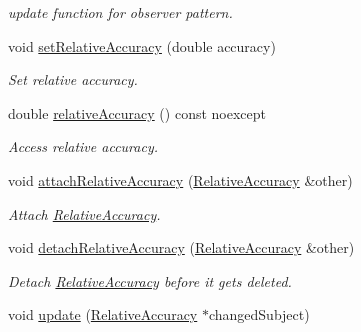 \begin{DoxyCompactItemize}
\begin{DoxyCompactList}\small\item\em update function for observer pattern. \end{DoxyCompactList}\item 
void \hyperlink{classSpacy_1_1Mixin_1_1RelativeAccuracy_aee88b71e80aca446a179f1310408a1e3_aee88b71e80aca446a179f1310408a1e3}{set\+Relative\+Accuracy} (double accuracy)
\begin{DoxyCompactList}\small\item\em Set relative accuracy. \end{DoxyCompactList}\item 
double \hyperlink{classSpacy_1_1Mixin_1_1RelativeAccuracy_a1da618cf9265c2edae354524df4a7f8a_a1da618cf9265c2edae354524df4a7f8a}{relative\+Accuracy} () const noexcept
\begin{DoxyCompactList}\small\item\em Access relative accuracy. \end{DoxyCompactList}\item 
void \hyperlink{classSpacy_1_1Mixin_1_1RelativeAccuracy_ae299bb5419df551cc93c6397e5b1b58b_ae299bb5419df551cc93c6397e5b1b58b}{attach\+Relative\+Accuracy} (\hyperlink{classSpacy_1_1Mixin_1_1RelativeAccuracy_ad843319a8782b47291fa31334e8bbd2a_ad843319a8782b47291fa31334e8bbd2a}{Relative\+Accuracy} \&other)
\begin{DoxyCompactList}\small\item\em Attach \hyperlink{classSpacy_1_1Mixin_1_1RelativeAccuracy}{Relative\+Accuracy}. \end{DoxyCompactList}\item 
\hypertarget{classSpacy_1_1Mixin_1_1RelativeAccuracy_a2636cde30aab8415e19e25fc12489e57}{}void \hyperlink{classSpacy_1_1Mixin_1_1RelativeAccuracy_a2636cde30aab8415e19e25fc12489e57}{detach\+Relative\+Accuracy} (\hyperlink{classSpacy_1_1Mixin_1_1RelativeAccuracy_ad843319a8782b47291fa31334e8bbd2a_ad843319a8782b47291fa31334e8bbd2a}{Relative\+Accuracy} \&other)\label{classSpacy_1_1Mixin_1_1RelativeAccuracy_a2636cde30aab8415e19e25fc12489e57}

\begin{DoxyCompactList}\small\item\em Detach \hyperlink{classSpacy_1_1Mixin_1_1RelativeAccuracy}{Relative\+Accuracy} before it gets deleted. \end{DoxyCompactList}\item 
\hypertarget{classSpacy_1_1Mixin_1_1RelativeAccuracy_acf0b58224d9a2879d05b5d2947f37527}{}void \hyperlink{classSpacy_1_1Mixin_1_1RelativeAccuracy_acf0b58224d9a2879d05b5d2947f37527}{update} (\hyperlink{classSpacy_1_1Mixin_1_1RelativeAccuracy_ad843319a8782b47291fa31334e8bbd2a_ad843319a8782b47291fa31334e8bbd2a}{Relative\+Accuracy} $\ast$changed\+Subject)\label{classSpacy_1_1Mixin_1_1RelativeAccuracy_acf0b58224d9a2879d05b5d2947f37527}


\end{DoxyCompactItemize}
